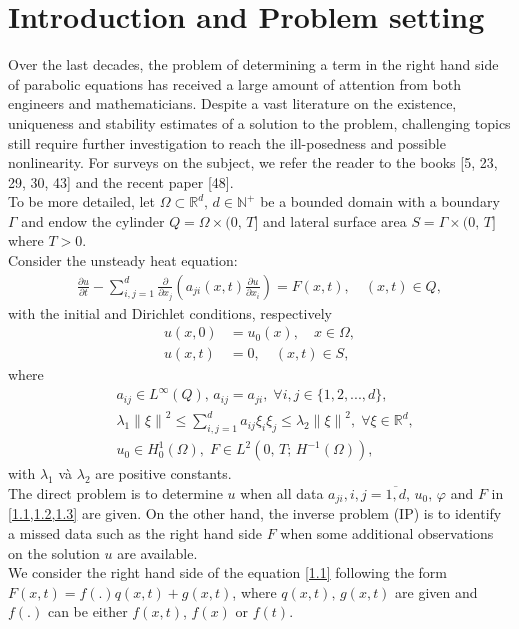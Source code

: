 \documentclass[]{article}
\begin{document}
\section{Introduction and Problem setting}
Over the last decades, the problem of determining a term in the right hand side of parabolic equations has received a large amount of attention from both engineers and mathematicians. Despite a vast literature on the existence, uniqueness and stability estimates of a solution to the problem, challenging topics still require further investigation to reach the ill-posedness and possible nonlinearity.
For surveys on the subject, we refer the reader to the books [5, 23, 29, 30, 43] and the recent paper [48].\\
To be more detailed, let $\Omega \subset \mathbb{R}^d,\, d\in \mathbb{N^+}$ be a bounded domain with a boundary $\Gamma$ and endow the cylinder $Q=\Omega\times (0,\, T]$ and lateral surface area $S=\Gamma \times (0,\, T]$ where $T>0$. 
\\
Consider the unsteady heat equation:
\begin{align}\label{1.1}
	\frac{\partial u}{\partial t}-\sum_{i, j=1}^{d}\frac{\partial}{\partial x_j}\left(a_{ji}(x, t)\frac{\partial u}{\partial x_i}\right)=F(x, t), \quad(x, t)\in Q,
\end{align}
with the initial and Dirichlet conditions, respectively
\begin{align}
	u(x, 0)&=u_0(x),\quad x\in \Omega,\label{1.2}\\
	u(x, t)&=0,\quad(x, t)\in S, \label{1.3}
\end{align}
where
\begin{align*}
	&a_{ij}\in L^{\infty}(Q),\, a_{ij}=a_{ji},\; \forall i, j\in \{1, 2, ..., d\},\\
	&\lambda_1\left\|\xi\right\|^2\leq \sum_{i, j=1}^{d}a_{ij}\xi_i\xi_j\leq \lambda_2\left\|\xi\right\|^2,\; \forall \xi\in\mathbb{R}^d,\\
	&u_0\in H^1_0(\Omega),\; F\in L^2(0,\, T;\, H^{-1}(\Omega)),
\end{align*}
with $\lambda_1$ và $\lambda_2$ are positive constants.
\\
The direct problem is to determine $u$ when all data $a_{ji}, i, j=\overline{1, d}, \,u_0, \,\varphi$ and $F$ in \cref{1.1,1.2,1.3} are given. On the other hand, the inverse problem (IP) is to identify a missed data such as the right hand side $F$ when some additional observations on the solution $u$ are available. 
\\
We consider the right hand side of the equation \eqref{1.1} following the form $F(x, t)=f(.)q(x, t)+g(x, t)$, where $q(x, t),\, g(x, t)$ are given and $f(.)$ can be either $f(x, t)$, $f(x)$ or $f(t)$.
\end{document}
